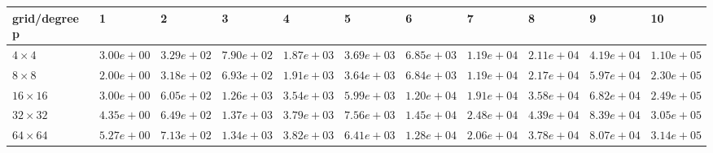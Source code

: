 \begin{tabular}{lllllllllll}
\hline
 grid/degree p   & 1          & 2          & 3          & 4          & 5          & 6          & 7          & 8          & 9          & 10         \\
\hline
 $4 \times 4$    & $3.00e+00$ & $3.29e+02$ & $7.90e+02$ & $1.87e+03$ & $3.69e+03$ & $6.85e+03$ & $1.19e+04$ & $2.11e+04$ & $4.19e+04$ & $1.10e+05$ \\
 $8 \times 8$    & $2.00e+00$ & $3.18e+02$ & $6.93e+02$ & $1.91e+03$ & $3.64e+03$ & $6.84e+03$ & $1.19e+04$ & $2.17e+04$ & $5.97e+04$ & $2.30e+05$ \\
 $16 \times 16$  & $3.00e+00$ & $6.05e+02$ & $1.26e+03$ & $3.54e+03$ & $5.99e+03$ & $1.20e+04$ & $1.91e+04$ & $3.58e+04$ & $6.82e+04$ & $2.49e+05$ \\
 $32 \times 32$  & $4.35e+00$ & $6.49e+02$ & $1.37e+03$ & $3.79e+03$ & $7.56e+03$ & $1.45e+04$ & $2.48e+04$ & $4.39e+04$ & $8.39e+04$ & $3.05e+05$ \\
 $64 \times 64$  & $5.27e+00$ & $7.13e+02$ & $1.34e+03$ & $3.82e+03$ & $6.41e+03$ & $1.28e+04$ & $2.06e+04$ & $3.78e+04$ & $8.07e+04$ & $3.14e+05$ \\
\hline
\end{tabular}